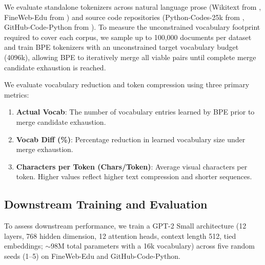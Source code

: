 \documentclass{article}
\begin{document}
We evaluate standalone tokenizers across natural language prose (Wikitext from \citealp{Merity2016}, FineWeb-Edu from \citealp{Penedo2024}) and source code repositories (Python-Codes-25k from \citealp{python_codes_dataset}, GitHub-Code-Python from \citealp{codeparrot_github_code}). To measure the unconstrained vocabulary footprint required to cover each corpus, we sample up to 100,000 documents per dataset and train BPE tokenizers with an unconstrained target vocabulary budget (4096k), allowing BPE to iteratively merge all viable pairs until complete merge candidate exhaustion is reached.

We evaluate vocabulary reduction and token compression using three primary metrics:
\begin{enumerate}
    \item \textbf{Actual Vocab}: The number of vocabulary entries learned by BPE prior to merge candidate exhaustion.
    \item \textbf{Vocab Diff (\%)}: Percentage reduction in learned vocabulary size under merge exhaustion.
    \item \textbf{Characters per Token (Chars/Token)}: Average visual characters per token. Higher values reflect higher text compression and shorter sequences.
\end{enumerate}

\subsection{Downstream Training and Evaluation}\label{sec:downstream_eval}

To assess downstream performance, we train a GPT-2 Small architecture (12 layers, 768 hidden dimension, 12 attention heads, context length 512, tied embeddings; $\sim$98M total parameters with a 16k vocabulary) across five random seeds (1--5) on FineWeb-Edu and GitHub-Code-Python.
\end{document}

